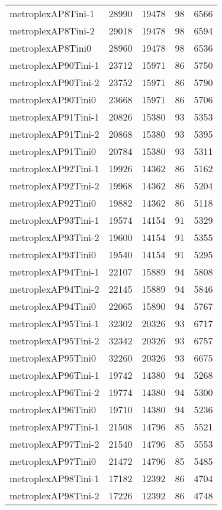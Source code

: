 \begin{longtable}{lrrrr}
metroplexAP8Tini-1 & 28990 & 19478 & 98 & 6566 \\
metroplexAP8Tini-2 & 29018 & 19478 & 98 & 6594 \\
metroplexAP8Tini0 & 28960 & 19478 & 98 & 6536 \\
metroplexAP90Tini-1 & 23712 & 15971 & 86 & 5750 \\
metroplexAP90Tini-2 & 23752 & 15971 & 86 & 5790 \\
metroplexAP90Tini0 & 23668 & 15971 & 86 & 5706 \\
metroplexAP91Tini-1 & 20826 & 15380 & 93 & 5353 \\
metroplexAP91Tini-2 & 20868 & 15380 & 93 & 5395 \\
metroplexAP91Tini0 & 20784 & 15380 & 93 & 5311 \\
metroplexAP92Tini-1 & 19926 & 14362 & 86 & 5162 \\
metroplexAP92Tini-2 & 19968 & 14362 & 86 & 5204 \\
metroplexAP92Tini0 & 19882 & 14362 & 86 & 5118 \\
metroplexAP93Tini-1 & 19574 & 14154 & 91 & 5329 \\
metroplexAP93Tini-2 & 19600 & 14154 & 91 & 5355 \\
metroplexAP93Tini0 & 19540 & 14154 & 91 & 5295 \\
metroplexAP94Tini-1 & 22107 & 15889 & 94 & 5808 \\
metroplexAP94Tini-2 & 22145 & 15889 & 94 & 5846 \\
metroplexAP94Tini0 & 22065 & 15890 & 94 & 5767 \\
metroplexAP95Tini-1 & 32302 & 20326 & 93 & 6717 \\
metroplexAP95Tini-2 & 32342 & 20326 & 93 & 6757 \\
metroplexAP95Tini0 & 32260 & 20326 & 93 & 6675 \\
metroplexAP96Tini-1 & 19742 & 14380 & 94 & 5268 \\
metroplexAP96Tini-2 & 19774 & 14380 & 94 & 5300 \\
metroplexAP96Tini0 & 19710 & 14380 & 94 & 5236 \\
metroplexAP97Tini-1 & 21508 & 14796 & 85 & 5521 \\
metroplexAP97Tini-2 & 21540 & 14796 & 85 & 5553 \\
metroplexAP97Tini0 & 21472 & 14796 & 85 & 5485 \\
metroplexAP98Tini-1 & 17182 & 12392 & 86 & 4704 \\
metroplexAP98Tini-2 & 17226 & 12392 & 86 & 4748 \\

\end{longtable}
